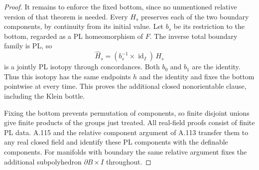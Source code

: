 \begin{proof}
It remains to enforce the fixed bottom, since no unmentioned
relative version of that theorem is needed. Every $H_s$
preserves each of the two boundary components, by continuity
from its initial value. Let $b_s$ be its restriction to the
bottom, regarded as a PL homeomorphism of $F$.
The inverse total boundary family is PL, so
\[
 \widehat H_s=(b_s^{-1}\times\operatorname{id}_I)\,H_s
\]
is a jointly PL isotopy through concordances.
Both $b_0$ and $b_1$ are the identity. Thus this isotopy has
the same endpoints $h$ and the identity and fixes the bottom
pointwise at every time. This proves the additional closed
nonorientable clause, including the Klein bottle.

Fixing the bottom prevents permutation of components, so finite
disjoint unions give finite products of the groups just treated.
All real-field proofs consist of finite PL data. A.115 and the
relative component argument of A.113 transfer them to any real
closed field and identify these PL components with the
definable components. For manifolds with boundary the same
relative argument fixes the additional subpolyhedron
$\partial B\times I$ throughout.
\end{proof}
